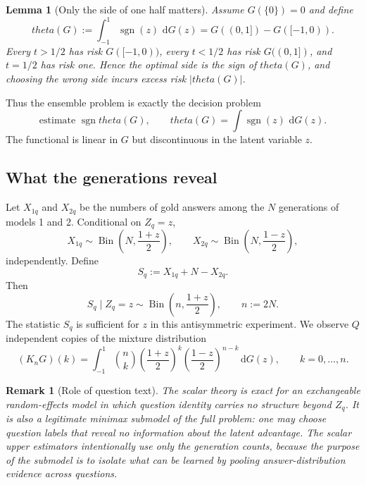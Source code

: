 \documentclass[11pt]{article}
\def\theta{theta}%
\newtheorem{lemma}[theorem]{Lemma}
\newtheorem{remark}[theorem]{Remark}
\newcommand{\sgn}{\operatorname{sgn}}
\newcommand{\Bin}{\operatorname{Bin}}
\newcommand{\dd}{\,\mathrm d}
\begin{document}
\begin{lemma}[Only the side of one half matters]
\label{lem:side}
Assume $G(\{0\})=0$ and define
\begin{equation}
\label{eq:theta}
\theta(G)
:=
\int_{-1}^1\sgn(z)\,\dd G(z)
=
G((0,1])-G([-1,0)).
\end{equation}
Every $t>1/2$ has risk $G([-1,0))$, every $t<1/2$ has risk $G((0,1])$, and $t=1/2$ has risk one.  Hence the optimal side is the sign of $\theta(G)$, and choosing the wrong side incurs excess risk $|\theta(G)|$.
\end{lemma}

Thus the ensemble problem is exactly the decision problem
\[
\text{estimate }\sgn\theta(G),
\qquad
\theta(G)=\int\sgn(z)\,\dd G(z).
\]
The functional is linear in $G$ but discontinuous in the latent variable $z$.

\subsection{What the generations reveal}

Let $X_{1q}$ and $X_{2q}$ be the numbers of gold answers among the $N$ generations of models 1 and 2.  Conditional on $Z_q=z$,
\[
X_{1q}\sim\Bin\left(N,\frac{1+z}{2}\right),
\qquad
X_{2q}\sim\Bin\left(N,\frac{1-z}{2}\right),
\]
independently.  Define
\begin{equation}
\label{eq:S-stat}
S_q:=X_{1q}+N-X_{2q}.
\end{equation}
Then
\begin{equation}
\label{eq:binomial-channel}
S_q\mid Z_q=z
\sim
\Bin\left(n,\frac{1+z}{2}\right),
\qquad n:=2N.
\end{equation}
The statistic $S_q$ is sufficient for $z$ in this antisymmetric experiment.  We observe $Q$ independent copies of the mixture distribution
\begin{equation}
\label{eq:KnG}
(K_nG)(k)
=
\int_{-1}^1
\binom nk
\left(\frac{1+z}{2}\right)^k
\left(\frac{1-z}{2}\right)^{n-k}
\dd G(z),
\qquad k=0,\dots,n.
\end{equation}

\begin{remark}[Role of question text]
The scalar theory is exact for an exchangeable random-effects model in which question identity carries no structure beyond $Z_q$.  It is also a legitimate minimax submodel of the full problem: one may choose question labels that reveal no information about the latent advantage.  The scalar upper estimators intentionally use only the generation counts, because the purpose of the submodel is to isolate what can be learned by pooling answer-distribution evidence across questions.
\end{remark}
\end{document}
